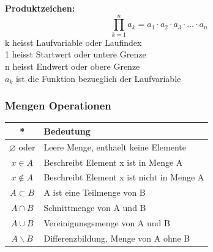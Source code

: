 \begin{multicols}{2}
    \textbf{Produktzeichen:}
    \[ \prod_{k=1}^{n} a_k = a_1 \cdot a_2 \cdot a_3 \cdot \ldots \cdot a_n\]
    k heisst Laufvariable oder Laufindex \\
    1 heisst Startwert oder untere Grenze \\
    n heisst Endwert oder obere Grenze \\
    $a_{k}$ ist die Funktion bezueglich der Laufvariable \\

    \subsubsection{Mengen Operationen}

    \begin{tabularx}{0.5\textwidth} {
            | >{\raggedright\arraybackslash}c
            | >{\raggedright\arraybackslash}X |}
        \hline
        \textbf{*}            & \textbf{Bedeutung}                        \\ \hline
        $\varnothing$ oder {} & Leere Menge, enthaelt keine Elemente      \\ \hline
        $x\in A$              & Beschreibt Element x ist in Menge A       \\ \hline
        $x\notin A$           & Beschreibt Element x ist nicht in Menge A \\ \hline
        $A\subset B$          & A ist eine Teilmenge von B                \\ \hline
        $A\cap B$             & Schnittmenge von A und B                  \\ \hline
        $A\cup B$             & Vereinigunsgsmenge von A und B            \\ \hline
        $A\backslash B$       & Differenzbildung, Menge von A ohne B      \\\hline
    \end{tabularx}
    \\~\\
    \\~\\
    \\~\\

    \def\firstcircle{(0,0) circle (1cm)}
    \def\secondcircle{(0:1.2cm) circle (1cm)}




\end{multicols}

